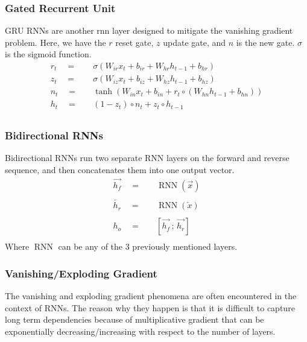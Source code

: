 \documentclass[twoside,twocolumn]{article}
\begin{document}
\subsubsection{Gated Recurrent Unit}
GRU RNNs are another rnn layer designed to mitigate the vanishing gradient
problem. Here, we have the $r$ reset gate, $z$ update gate, and $n$ is the
new gate. $\sigma$ is the sigmoid function.
\begin{equation}
  \begin{split}
    r_t \quad =& \quad \sigma \left( W_{ir} x_t + b_{ir} + W_{hr} h_{t-1} + b_{hr} \right) \\
    z_t \quad =& \quad \sigma \left( W_{iz} x_t + b_{iz} + W_{hz} h_{t-1} + b_{hz} \right) \\
    n_t \quad =& \quad \tanh \left( W_{in} x_t + b_{in} + r_t \circ \left( W_{hn} h_{t-1} + b_{hn} \right) \right) \\
    h_t \quad =& \quad \left(1-z_t\right) \circ n_t + z_t \circ h_{t-1} \\
  \end{split}
\end{equation}
\subsubsection{Bidirectional RNNs}
Bidirectional RNNs run two separate RNN layers on the forward and reverse
sequence, and then concatenates them into one output vector.
\begin{equation}
  \begin{split}
    \overrightarrow{h_f} \quad =& \quad \operatorname{RNN}\left(\overrightarrow{x}\right) \\
    \\
    \overleftarrow{h_r} \quad =& \quad \operatorname{RNN}\left(\overleftarrow{x}\right) \\
    \\
    h_o \quad =& \quad \left[\overrightarrow{h_f} \,;\, \overrightarrow{h_r} \right] \\
  \end{split}
\end{equation}
Where $\operatorname{RNN}$ can be any of the 3 previously mentioned layers.
\subsubsection{Vanishing/Exploding Gradient}
The vanishing and exploding gradient phenomena are often encountered in the
context of RNNs. The reason why they happen is that it is difficult to
capture long term dependencies because of multiplicative gradient that can
be exponentially decreasing/increasing with respect to the number of layers.
\end{document}
